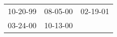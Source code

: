 \begin{supertabular}{p{0.33\columnwidth}p{0.33\columnwidth}p{0.33\columnwidth}}
 10-20-99\textsuperscript{} &  08-05-00\textsuperscript{} &  02-19-01\textsuperscript{} \\
 03-24-00\textsuperscript{} &  10-13-00\textsuperscript{} &                             \\
\end{supertabular}
